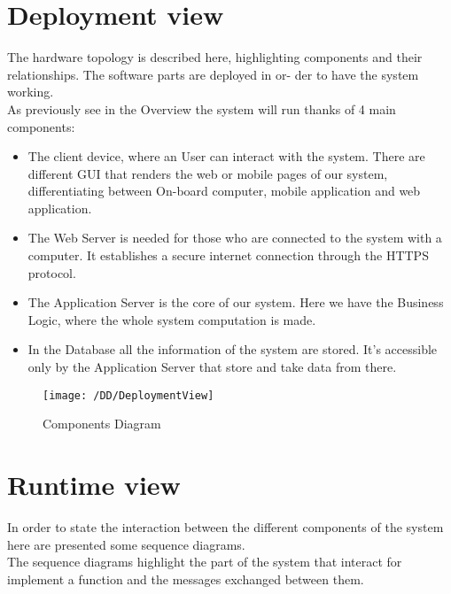 \section{Deployment view}
The hardware topology is described here, highlighting components and their relationships. The software parts are deployed in or-
der to have the system working.
\\As previously see in the Overview the system will run thanks of 4 main components:
\begin{itemize}
	\item{The client device, where an User can interact with the system. There are different GUI that renders the web or mobile pages of our system, differentiating between On-board computer, mobile application and web application.}
	\item{ The Web Server is needed for those who are connected to the system with a computer. It establishes a secure internet connection through the HTTPS protocol.}
	\item{The Application Server is the core of our system. Here we have the Business Logic, where the whole system computation is
made.}
	\item{In the Database all the information of the system are stored. It's accessible only by the Application Server that store and take data from there.}
\end{itemize} 

\begin{figure}[!h]
  \centering
  \vspace{0.2cm}
  \texttt{[image: /DD/DeploymentView]}\\
  \vspace{0.4cm}
  \caption{Components Diagram} 
  \label{fig:Deployment View} 
\end{figure}


\section{Runtime view}

In order to state the interaction between the different components of the system here are presented some sequence diagrams.
\\The sequence diagrams highlight the part of the system that interact for implement a function and the messages exchanged between them.



